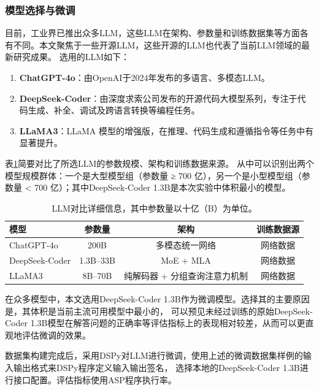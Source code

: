 \subsubsection{模型选择与微调}
目前，工业界已推出众多LLM，这些LLM在架构、参数量和训练数据集等方面各有不同。本文聚焦于一些开源LLM，这些开源的LLM也代表了当前LLM领域的最新研究成果。
选用的LLM如下：
\begin{enumerate}[itemsep=0pt,parsep=0pt]
\item \textbf{ChatGPT-4o}：由OpenAI于2024年发布的多语言、多模态LLM。
\item \textbf{DeepSeek-Coder}：由深度求索公司发布的开源代码大模型系列，专注于代码生成、补全、调试及跨语言转换等编程任务。
\item \textbf{LLaMA3}：LLaMA 模型的增强版，在推理、代码生成和遵循指令等任务中有显著提升。
\end{enumerate}
表\ref{tab:llm-comparison}简要对比了所选LLM的参数规模、架构和训练数据来源。
从中可以识别出两个模型规模群体：一个是大型模型组（参数量 ≥ 700 亿），另一个是小型模型组（参数量 < 700 亿）；其中DeepSeek-Coder 1.3B是本次实验中体积最小的模型。

\begin{table}[ht]
    \centering
    \begin{tabular}{lccc}
        \toprule
        \textbf{模型} & \textbf{参数量} & \textbf{架构} & \textbf{训练数据源} \\
        \midrule
        ChatGPT-4o    & 200B      & 多模态统一网络           & 网络数据         \\
        DeepSeek-Coder       & 1.3B--33B      & MoE + MLA            & 网络数据    \\
        LLaMA3         & 8B--70B   & 纯解码器 + 分组查询注意力机制   & 网络数据         \\
        \bottomrule
    \end{tabular}
    \caption{LLM对比详细信息，其中参数量以十亿（B）为单位。}
    \label{tab:llm-comparison}
\end{table}

在众多模型中，本文选用DeepSeek-Coder 1.3B作为微调模型。选择其的主要原因是，其体积是当前主流可用模型中最小的，
可以预见未经过训练的原始DeepSeek-Coder 1.3B模型在解答问题的正确率等评估指标上的表现相对较差，从而可以更直观地评估微调的效果。

数据集构建完成后，采用DSPy对LLM进行微调，使用上述的微调数据集样例的输入输出格式来DSPy程序定义输入输出签名，
选择本地的DeepSeek-Coder 1.3B进行接口配置。评估指标使用ASP程序执行率。

